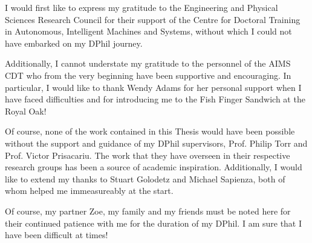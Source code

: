 I would first like to express my gratitude to the Engineering and Physical Sciences 
Research Council for their support of the Centre for Doctoral Training in Autonomous, 
Intelligent Machines and Systems, without which I could not have embarked on my DPhil 
journey. 

Additionally, I cannot understate my gratitude to the personnel of the AIMS 
CDT who from the very beginning have been supportive and encouraging. In particular, I 
would like to thank Wendy Adams for her personal support when I have faced difficulties 
and for introducing me to the Fish Finger Sandwich at the Royal Oak!

Of course, none of the work contained in this Thesis would have been possible without the 
support and guidance of my DPhil supervisors, Prof\@. Philip Torr and Prof\@. Victor Prisacariu. 
The work that they have overseen in their respective research groups has been a source of 
academic inspiration. Additionally, I would like to extend my thanks to Stuart Golodetz and 
Michael Sapienza, both of whom helped me immeasureably at the start.

Of course, my partner Zoe, my family and my friends must be noted here for their continued patience 
with me for the duration of my DPhil. I am sure that I have been difficult at times!